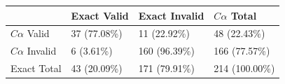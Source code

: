 \begin{tabular}{llll}
\toprule
 & Exact Valid & Exact Invalid & $C\alpha$ Total \\
\midrule
$C\alpha$ Valid & 37 (77.08\%) & 11 (22.92\%) & 48 (22.43\%) \\
$C\alpha$ Invalid & 6 (3.61\%) & 160 (96.39\%) & 166 (77.57\%) \\
Exact Total & 43 (20.09\%) & 171 (79.91\%) & 214 (100.00\%) \\
\bottomrule
\end{tabular}
